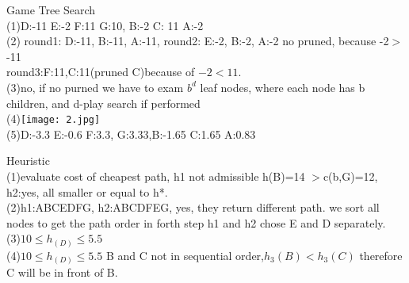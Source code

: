 \documentclass[12pt]{article}
\newenvironment{problem}[2][Problem]{\begin{trivlist}
\item[\hskip \labelsep {\bfseries #1}\hskip \labelsep {\bfseries #2.}]}{\end{trivlist}}
\begin{document}
\begin{problem}{2}Game Tree Search\\
(1)D:-11 E:-2 F:11 G:10, B:-2 C: 11 A:-2\\
(2) round1: D:-11, B:-11, A:-11, round2: E:-2, B:-2, A:-2 no pruned, because -2$>$-11\\
round3:F:11,C:11(pruned C)because of $-2<11$.\\
(3)no, if no purned we have to exam $b^d$ leaf nodes, where each node has b children, and d-play search if performed\\
(4)\texttt{[image: 2.jpg]}\\
(5)D:-3.3 E:-0.6 F:3.3, G:3.33,B:-1.65 C:1.65 A:0.83 \\

\end{problem}
\begin{problem}{3}Heuristic\\
(1)evaluate cost of cheapest path, h1 not admissible h(B)=14 $>$c(b,G)=12, h2:yes, all smaller or equal to h*.\\
(2)h1:ABCEDFG, h2:ABCDFEG, yes, they return different path. we sort all nodes to get the path order in forth step h1 and h2 chose E and D separately. \\
(3)$10\leq h_(D) \leq5.5 $\\
(4)$10\leq h_(D) \leq5.5 $ B and C not in sequential order,$h_3(B) < h_3(C)$ therefore C will be in front of B.\\
\end{problem}
\end{document}
